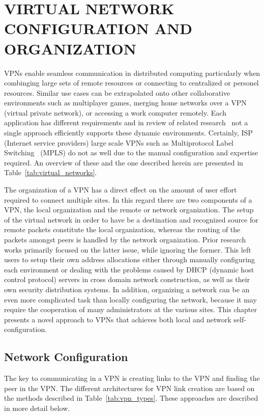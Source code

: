 \chapter{VIRTUAL NETWORK CONFIGURATION AND ORGANIZATION}
\label{chap:vpns}

VPNs enable seamless communication in distributed computing particularly when
combinging large sets of remote resources or connecting to centralized or
personel resources.  Similar use cases can be extrapolated onto other
collaborative environments such as multiplayer games, merging home networks
over a VPN (virtual private network), or accessing a work computer remotely.
Each application has different requirements and in review of related
research~\cite{ipop, vine, violin, vnet, ocala, softudc, openvpn, hamachi,
wippien, gbridge, pvc, tinc, n2n, p2pvpn, l2tp} not a single approach
efficiently supports these dynamic environments.  Certainly, ISP (Internet
service providers) large scale VPNs such as Multiprotocol Label
Switching~\cite{mpls} (MPLS) do not as well due to the manual configuration and
expertise required.  An overview of these and the one described herein are
presented in Table~\ref{tab:virtual_networks}.

The organization of a VPN has a direct effect on the amount of user effort
required to connect multiple sites.  In this regard there are two components of
a VPN, the local organization and the remote or network organization.  The
setup of the virtual network in order to have be a destination and recognized
source for remote packets constitute the local organization, whereas the
routing of the packets amongst peers is handled by the network organization.
Prior research works primarily focused on the latter issue, while ignoring the
former.  This left users to setup their own address allocations either through
manually configuring each environment or dealing with the problems caused by
DHCP (dynamic host control protocol) servers in cross domain network
construction, as well as their own security distribution systems.  In addition,
organizing a network can be an even more complicated task than locally
configuring the network, because it may require the cooperation of many
administrators at the various sites.  This chapter presents a novel approach to
VPNs that achieves both local and network self-configuration.

\section{Network Configuration} The key to communicating in a VPN is creating
links to the VPN and finding the peer in the VPN.  The different architectures
for VPN link creation are based on the methods described in
Table~\ref{tab:vpn_types}.  These approaches are described in more detail
below.

